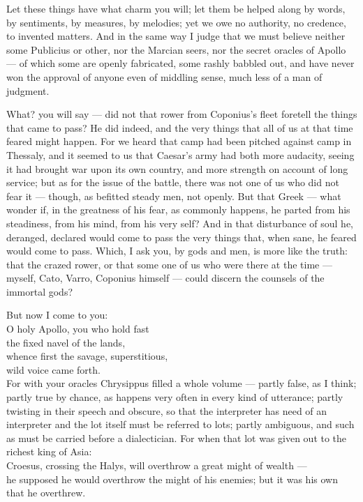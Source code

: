  Let these things have what charm you will; let them be helped along by words, by sentiments, by measures, by melodies; yet we owe no authority, no credence, to invented matters. And in the same way I judge that we must believe neither some Publicius or other, nor the Marcian seers, nor the secret oracles of Apollo — of which some are openly fabricated, some rashly babbled out, and have never won the approval of anyone even of middling sense, much less of a man of judgment.

 What? you will say — did not that rower from Coponius's fleet foretell the things that came to pass? He did indeed, and the very things that all of us at that time feared might happen. For we heard that camp had been pitched against camp in Thessaly, and it seemed to us that Caesar's army had both more audacity, seeing it had brought war upon its own country, and more strength on account of long service; but as for the issue of the battle, there was not one of us who did not fear it — though, as befitted steady men, not openly. But that Greek — what wonder if, in the greatness of his fear, as commonly happens, he parted from his steadiness, from his mind, from his very self? And in that disturbance of soul he, deranged, declared would come to pass the very things that, when sane, he feared would come to pass. Which, I ask you, by gods and men, is more like the truth: that the crazed rower, or that some one of us who were there at the time — myself, Cato, Varro, Coponius himself — could discern the counsels of the immortal gods?

 But now I come to you: \\ O holy Apollo, you who hold fast \\ the fixed navel of the lands, \\ whence first the savage, superstitious, \\ wild voice came forth. \\ For with your oracles Chrysippus filled a whole volume — partly false, as I think; partly true by chance, as happens very often in every kind of utterance; partly twisting in their speech and obscure, so that the interpreter has need of an interpreter and the lot itself must be referred to lots; partly ambiguous, and such as must be carried before a dialectician. For when that lot was given out to the richest king of Asia: \\ Croesus, crossing the Halys, will overthrow a great might of wealth — \\ he supposed he would overthrow the might of his enemies; but it was his own that he overthrew.

